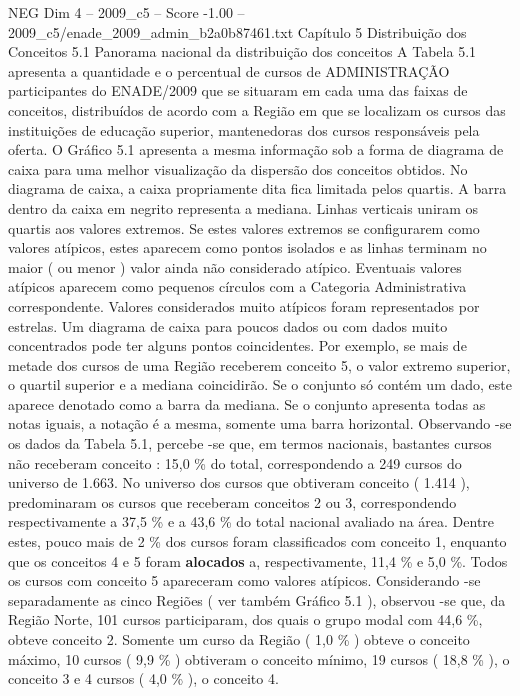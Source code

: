 \begin{textsample}{NEG Dim 4 – 2009\_c5 – Score -1.00 – 2009\_c5/enade\_2009\_admin\_b2a0b87461.txt}  \label{ex:f4_neg_088}
Capítulo 5 Distribuição dos Conceitos 5.1 Panorama nacional da distribuição dos conceitos A Tabela 5.1 apresenta a quantidade e o percentual de cursos de ADMINISTRAÇÃO participantes do ENADE/2009 que se situaram em cada uma das faixas de conceitos, distribuídos de acordo com a Região em que se localizam os cursos das instituições de educação superior, mantenedoras dos cursos responsáveis pela oferta.
O Gráfico 5.1 apresenta a mesma informação sob a forma de diagrama de caixa para uma melhor visualização da dispersão dos conceitos obtidos.
No diagrama de caixa, a caixa propriamente dita fica limitada pelos quartis.
A barra dentro da caixa em negrito representa a mediana.
Linhas verticais uniram os quartis aos valores extremos.
Se estes valores extremos se configurarem como valores atípicos, estes aparecem como pontos isolados e as linhas terminam no maior ( ou menor ) valor ainda não considerado atípico.
Eventuais valores atípicos aparecem como pequenos círculos com a Categoria Administrativa correspondente.
Valores considerados muito atípicos foram representados por estrelas.
Um diagrama de caixa para poucos dados ou com dados muito concentrados pode ter alguns pontos coincidentes.
Por exemplo, se mais de metade dos cursos de uma Região receberem conceito 5, o valor extremo superior, o quartil superior e a mediana coincidirão.
Se o conjunto só contém um dado, este aparece denotado como a barra da mediana.
Se o conjunto apresenta todas as notas iguais, a notação é a mesma, somente uma barra horizontal.
Observando -se os dados da Tabela 5.1, percebe -se que, em termos nacionais, bastantes cursos não receberam conceito : 15,0 \% do total, correspondendo a 249 cursos do universo de 1.663.
No universo dos cursos que obtiveram conceito ( 1.414 ), predominaram os cursos que receberam conceitos 2 ou 3, correspondendo respectivamente a 37,5 \% e a 43,6 \% do total nacional avaliado na área.
Dentre estes, pouco mais de 2 \% dos cursos foram classificados com conceito 1, enquanto que os conceitos 4 e 5 foram \textbf{alocados} a, respectivamente, 11,4 \% e 5,0 \%.
Todos os cursos com conceito 5 apareceram como valores atípicos.
Considerando -se separadamente as cinco Regiões ( ver também Gráfico 5.1 ), observou -se que, da Região Norte, 101 cursos participaram, dos quais o grupo modal com 44,6 \%, obteve conceito 2.
Somente um curso da Região ( 1,0 \% ) obteve o conceito máximo, 10 cursos ( 9,9 \% ) obtiveram o conceito mínimo, 19 cursos ( 18,8 \% ), o conceito 3 e 4 cursos ( 4,0 \% ), o conceito 4.

\end{textsample}
